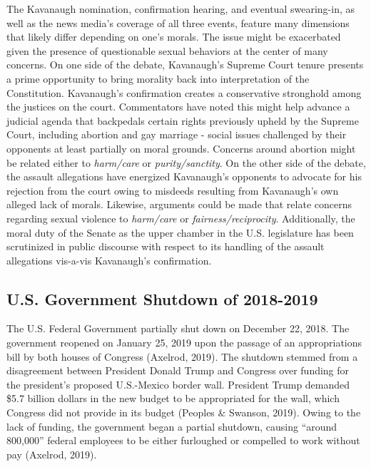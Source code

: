\documentclass[english,,man]{apa6}
\begin{document}
The Kavanaugh nomination, confirmation hearing, and eventual swearing-in, as well as the news media's coverage of all three events, feature many dimensions that likely differ depending on one's morals. The issue might be exacerbated given the presence of questionable sexual behaviors at the center of many concerns. On one side of the debate, Kavanaugh's Supreme Court tenure presents a prime opportunity to bring morality back into interpretation of the Constitution. Kavanaugh's confirmation creates a conservative stronghold among the justices on the court. Commentators have noted this might help advance a judicial agenda that backpedals certain rights previously upheld by the Supreme Court, including abortion and gay marriage - social issues challenged by their opponents at least partially on moral grounds. Concerns around abortion might be related either to \emph{harm/care} or \emph{purity/sanctity}. On the other side of the debate, the assault allegations have energized Kavanaugh's opponents to advocate for his rejection from the court owing to misdeeds resulting from Kavanaugh's own alleged lack of morals. Likewise, arguments could be made that relate concerns regarding sexual violence to \emph{harm/care} or \emph{fairness/reciprocity}. Additionally, the moral duty of the Senate as the upper chamber in the U.S. legislature has been scrutinized in public discourse with respect to its handling of the assault allegations vis-a-vis Kavanaugh's confirmation.

\hypertarget{u.s.-government-shutdown-of-2018-2019}{%
\subsection{U.S. Government Shutdown of 2018-2019}\label{u.s.-government-shutdown-of-2018-2019}}

The U.S. Federal Government partially shut down on December 22, 2018. The government reopened on January 25, 2019 upon the passage of an appropriations bill by both houses of Congress (Axelrod, 2019). The shutdown stemmed from a disagreement between President Donald Trump and Congress over funding for the president's proposed U.S.-Mexico border wall. President Trump demanded \$5.7 billion dollars in the new budget to be appropriated for the wall, which Congress did not provide in its budget (Peoples \& Swanson, 2019). Owing to the lack of funding, the government began a partial shutdown, causing \enquote{around 800,000} federal employees to be either furloughed or compelled to work without pay (Axelrod, 2019).
\end{document}
